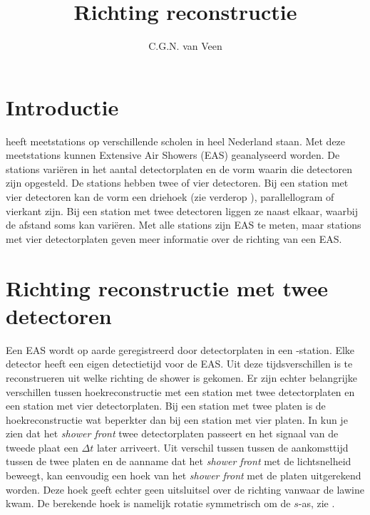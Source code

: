 

\title{Richting reconstructie}
\author{C.G.N. van Veen} 



\maketitle

\section{Introductie}

\hisparc heeft meetstations op verschillende scholen in heel Nederland
staan. Met deze meetstations kunnen Extensive Air Showers (EAS)
geanalyseerd worden. De stations variëren in het aantal detectorplaten
en de vorm waarin die detectoren zijn opgesteld. De stations hebben twee
of vier detectoren. Bij een station met vier detectoren kan de vorm een
driehoek (zie verderop ), parallellogram of
vierkant zijn. Bij een station met twee detectoren liggen ze naast
elkaar, waarbij de afstand soms kan variëren. Met alle stations zijn EAS
te meten, maar stations met vier detectorplaten geven meer informatie over de richting van een EAS.


\section{Richting reconstructie met twee detectoren}

Een EAS wordt op aarde geregistreerd door detectorplaten in een
\hisparc-station. Elke detector heeft een eigen detectietijd voor de
EAS. Uit deze tijdsverschillen is te reconstrueren uit welke richting de
shower is gekomen. Er zijn echter belangrijke verschillen tussen
hoekreconstructie met een station met twee detectorplaten en een station
met vier detectorplaten. Bij een station met twee platen is de
hoekreconstructie wat beperkter dan bij een station met vier platen. In
 kun je zien dat het \emph{shower front} twee
detectorplaten passeert en het signaal van de tweede plaat een $\Delta t$
later arriveert. Uit verschil tussen tussen de aankomsttijd tussen de
twee platen en de aanname dat het \emph{shower front} met de
lichtsnelheid beweegt, kan eenvoudig een hoek van het \emph{shower front}
met de platen uitgerekend worden. Deze hoek geeft echter
geen uitsluitsel over de richting vanwaar de lawine kwam. De berekende hoek
is namelijk rotatie symmetrisch om de $s$-as, zie
. 

